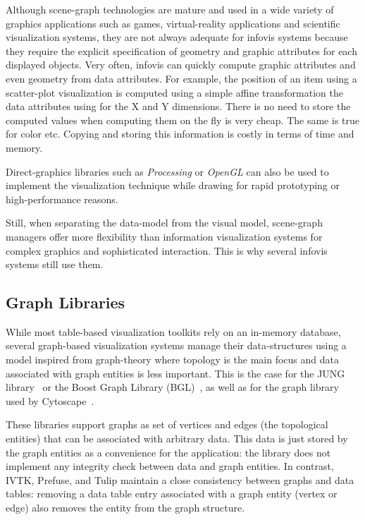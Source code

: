 Although scene-graph technologies are mature and used in a wide
variety of graphics applications such as games, virtual-reality
applications and scientific visualization systems, they are not always
adequate for infovis systems because they require
the explicit specification of geometry and graphic attributes for each
displayed objects.  Very often, infovis can quickly
compute graphic attributes and even geometry from data attributes.
For example, the position of an item using a scatter-plot visualization
is computed using a simple affine transformation the data attributes
using for the X and Y dimensions.  There is no need to store the
computed values when computing them on the fly is very cheap.  The
same is true for color etc.  Copying and storing this information is
costly in terms of time and memory.

Direct-graphics libraries such as \emph{Processing} or \emph{OpenGL}
can also be used to implement the visualization technique while
drawing for rapid prototyping or high-performance reasons.


Still, when separating the data-model from the visual model,
scene-graph managers offer more flexibility than information
visualization systems for complex graphics and sophisticated
interaction.  This is why several infovis systems
still use them.


\subsection{Graph Libraries}

While most table-based visualization toolkits rely on an in-memory
database, several graph-based visualization systems manage their
data-structures using a model inspired from graph-theory where
topology is the main focus and data associated with graph entities is
less important.  This is the case for the JUNG library~\cite{jung2003}
or the Boost Graph Library (BGL)~\cite{BGL}, as well as for the graph
library used by Cytoscape~\cite{Cytoscape}.

These libraries support graphs as set of vertices and edges (the
topological entities) that can be associated with arbitrary data.
This data is just stored by the graph entities as a convenience for
the application: the library does not implement any integrity check
between data and graph entities.  In contrast, IVTK, Prefuse, and
Tulip maintain a close consistency between graphs and data tables:
removing a data table entry associated with a graph entity (vertex or
edge) also removes the entity from the graph structure.

